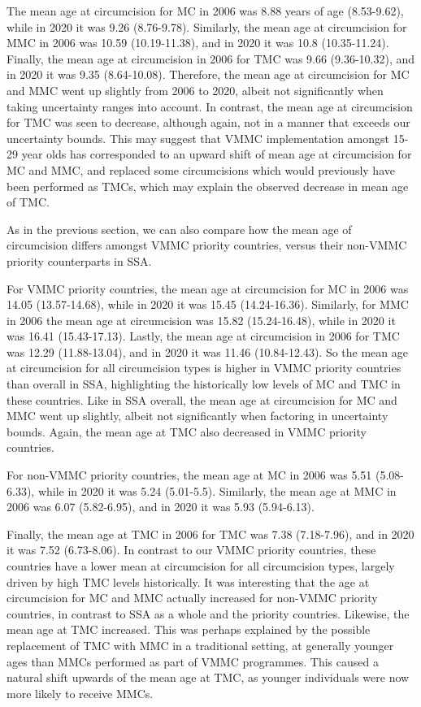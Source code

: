 \documentclass{article}
\begin{document}
The mean age at circumcision for MC in 2006 was 8.88 years of age
(8.53-9.62), while in 2020 it was 9.26 (8.76-9.78). Similarly, the mean
age at circumcision for MMC in 2006 was 10.59 (10.19-11.38), and in 2020
it was 10.8 (10.35-11.24). Finally, the mean age at circumcision in 2006
for TMC was 9.66 (9.36-10.32), and in 2020 it was 9.35 (8.64-10.08).
Therefore, the mean age at circumcision for MC and MMC went up slightly
from 2006 to 2020, albeit not significantly when taking uncertainty
ranges into account. In contrast, the mean age at circumcision for TMC
was seen to decrease, although again, not in a manner that exceeds our
uncertainty bounds. This may suggest that VMMC implementation amongst
15-29 year olds has corresponded to an upward shift of mean age at
circumcision for MC and MMC, and replaced some circumcisions which would
previously have been performed as TMCs, which may explain the observed
decrease in mean age of TMC.

As in the previous section, we can also compare how the mean age of
circumcision differs amongst VMMC priority countries, versus their
non-VMMC priority counterparts in SSA.

For VMMC priority countries, the mean age at circumcision for MC in 2006
was 14.05 (13.57-14.68), while in 2020 it was 15.45 (14.24-16.36).
Similarly, for MMC in 2006 the mean age at circumcision was 15.82
(15.24-16.48), while in 2020 it was 16.41 (15.43-17.13). Lastly, the
mean age at circumcision in 2006 for TMC was 12.29 (11.88-13.04), and in
2020 it was 11.46 (10.84-12.43). So the mean age at circumcision for all
circumcision types is higher in VMMC priority countries than overall in
SSA, highlighting the historically low levels of MC and TMC in these
countries. Like in SSA overall, the mean age at circumcision for MC and
MMC went up slightly, albeit not significantly when factoring in
uncertainty bounds. Again, the mean age at TMC also decreased in VMMC
priority countries.

For non-VMMC priority countries, the mean age at MC in 2006 was 5.51
(5.08-6.33), while in 2020 it was 5.24 (5.01-5.5). Similarly, the mean
age at MMC in 2006 was 6.07 (5.82-6.95), and in 2020 it was 5.93
(5.94-6.13).

Finally, the mean age at TMC in 2006 for TMC was 7.38 (7.18-7.96), and
in 2020 it was 7.52 (6.73-8.06). In contrast to our VMMC priority
countries, these countries have a lower mean at circumcision for all
circumcision types, largely driven by high TMC levels historically. It
was interesting that the age at circumcision for MC and MMC actually
increased for non-VMMC priority countries, in contrast to SSA as a whole
and the priority countries. Likewise, the mean age at TMC increased.
This was perhaps explained by the possible replacement of TMC with MMC
in a traditional setting, at generally younger ages than MMCs performed
as part of VMMC programmes. This caused a natural shift upwards of the
mean age at TMC, as younger individuals were now more likely to receive MMCs.
\end{document}
